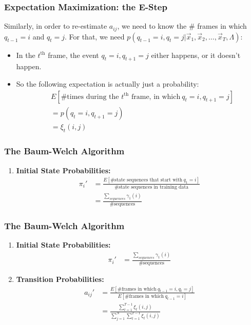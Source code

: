 \documentclass{beamer}
\begin{document}
\begin{frame}
  \frametitle{Expectation Maximization: the E-Step}

  Similarly, in order to re-estimate $a_{ij}$, we need to know the
  \# frames in which $q_{t-1}=i$ and $q_t=j$. For that, we need
  $p(q_{t-1}=i,q_t=j|\vec{x}_1,\vec{x}_2,\ldots,\vec{x}_T,\Lambda)$:
  \begin{itemize}
  \item In the $t^{\textrm{th}}$ frame, the event $q_{t}=i,q_{t+1}=j$ either
    happens, or it doesn't happen.
  \item So the following  expectation is actually just a  probability:
    \begin{align*}
      & E\left[\mbox{\# times during the $t^{\textrm{th}}$ frame, in which}~q_{t}=i,q_{t+1}=j\right] \\
      & = p(q_{t}=i,q_{t+1}=j)\\
      &= \xi_t(i,j)
    \end{align*}
  \end{itemize}
\end{frame}


\begin{frame}
  \frametitle{The Baum-Welch Algorithm}

  \begin{enumerate}
  \item {\bf Initial State Probabilities:}
    \begin{align*}
      \pi_i'&=\frac{E\left[\mbox{\# state sequences that start with}~q_1=i\right]}{\mbox{\# state sequences in training data}}\\
      &=\frac{\sum_{sequences} \gamma_1(i)}{\mbox{\# sequences}}
    \end{align*}
  \end{enumerate}
\end{frame}

\begin{frame}
  \frametitle{The Baum-Welch Algorithm}

  \begin{enumerate}
  \item {\bf Initial State Probabilities:}
    \begin{align*}
      \pi_i'  &=\frac{\sum_{sequences} \gamma_1(i)}{\mbox{\# sequences}}
    \end{align*}
  \item {\bf Transition Probabilities:}
    \begin{align*}
      a_{ij}'&=\frac{E\left[\mbox{\# frames in which}~q_{t-1}=i,q_t=j\right]}{E\left[\mbox{\# frames in which}~q_{t-1}=i\right]}\\
      &=\frac{\sum_{t=1}^{T-1} \xi_t(i,j)}{\sum_{j=1}^N\sum_{t=1}^{T-1}\xi_t(i,j)}
    \end{align*}
  \end{enumerate}
\end{frame}
\end{document}
